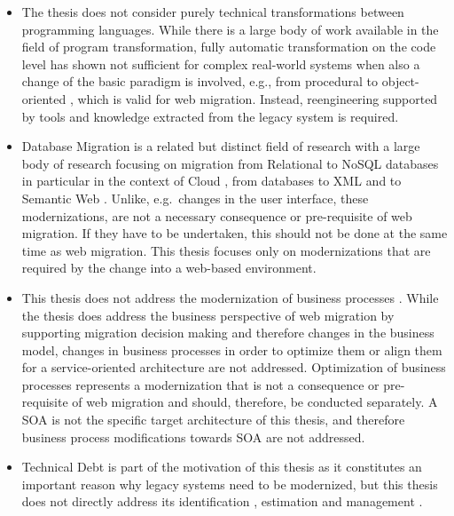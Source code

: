 \begin{itemize}
\tightlist
\item
  The thesis does not consider purely technical transformations between programming languages.
While there is a large body of work available in the field of program transformation, fully automatic transformation on the code level \autocite[cf.~family F1 in][]{Razavian2013PHD} has shown not sufficient for complex real-world systems when also a change of the basic paradigm is involved, e.g., from procedural to object-oriented \autocite{Sneed2010SoftwareMigration}, which is valid for web migration.
Instead, reengineering \autocite{ISO/IEEE24765Vocabulary,IEEE1219Maintenance} supported by tools and knowledge extracted from the legacy system is required.
\item
  Database Migration is a related but distinct field of research with a large body of research focusing on migration from Relational to NoSQL databases \autocite{Karnitis2015,Zhao2014a,Rocha2015RelationalNoSQL} in particular in the context of Cloud \autocite{Strauch2013}, from databases to XML \autocite{Li2014,Tzvetkov2005} and to Semantic Web \autocite{Vavliakis2013,Vavliakis2011,XuanFan2010}.
Unlike, e.g.~changes in the user interface, these modernizations, are not a necessary consequence or pre-requisite of web migration.
If they have to be undertaken, this should not be done at the same time as web migration.
This thesis focuses only on modernizations that are required by the change into a web-based environment.
\item
  This thesis does not address the modernization of business processes \autocite[cf.~ADM Business Domain modernization@Perez-Castillo2011KDM; and family F3 in][]{Razavian2013PHD}.
While the thesis does address the business perspective of web migration by supporting migration decision making and therefore changes in the business model, changes in business processes in order to optimize them or align them for a service-oriented architecture \autocite{Razavian2013PHD,Razavian2010SAPIENSA,Nguyen2009} are not addressed.
Optimization of business processes represents a modernization that is not a consequence or pre-requisite of web migration and should, therefore, be conducted separately.
A SOA is not the specific target architecture of this thesis, and therefore business process modifications towards SOA are not addressed.
\item
  Technical Debt is part of the motivation of this thesis as it constitutes an important reason why legacy systems need to be modernized, but this thesis does not directly address its identification \autocite{Li2015TDSMS}, estimation \autocite{Curtis2012EstimatingTD} and management \autocite{Yli-Huumo2016TD,Li2015TDSMS}.

\end{itemize}
